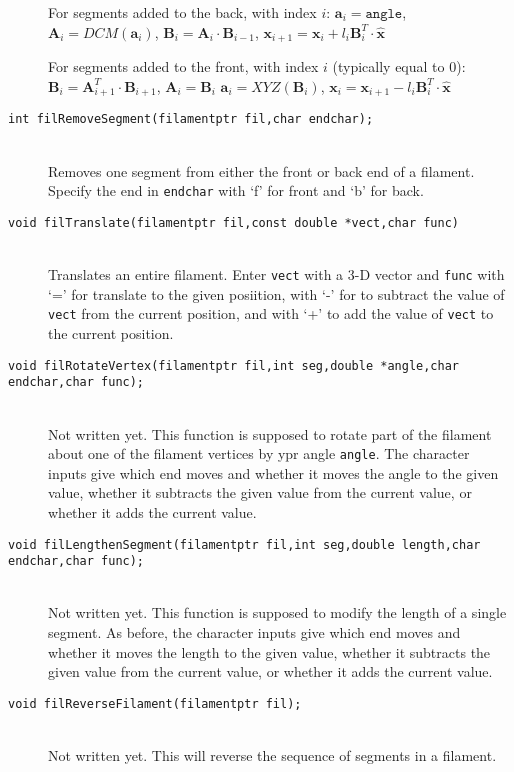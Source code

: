 \documentclass {book}
\begin{document}
\begin{description}
For segments added to the back, with index $i$:
$\mathbf{a}_i = \texttt{angle}$,
$\mathbf{A}_i = DCM(\mathbf{a}_i)$,
$\mathbf{B}_i = \mathbf{A}_i \cdot \mathbf{B}_{i-1}$,
$\mathbf{x}_{i+1} = \mathbf{x}_i + l_i \mathbf{B}^T_i \cdot \mathbf{\hat{x}}$

For segments added to the front, with index $i$ (typically equal to 0):
$\mathbf{B}_i = \mathbf{A}_{i+1}^T \cdot \mathbf{B}_{i+1}$,
$\mathbf{A}_i = \mathbf{B}_i$
$\mathbf{a}_i = XYZ(\mathbf{B}_i)$,
$\mathbf{x}_i = \mathbf{x}_{i+1} - l_i \mathbf{B}^T_i \cdot \mathbf{\hat{x}}$

\item[\texttt{int filRemoveSegment(filamentptr fil,char endchar);}]
\hfill \\
Removes one segment from either the front or back end of a filament.  Specify the end in \texttt{endchar} with `f' for front and `b' for back.

\item[\texttt{void filTranslate(filamentptr fil,const double *vect,char func)}]
\hfill \\
Translates an entire filament.  Enter \texttt{vect} with a 3-D vector and \texttt{func} with `=' for translate to the given posiition, with `-' for to subtract the value of \texttt{vect} from the current position, and with `+' to add the value of \texttt{vect} to the current position.

\item[\texttt{void filRotateVertex(filamentptr fil,int seg,double *angle,char endchar,char func);}]
\hfill \\
Not written yet.  This function is supposed to rotate part of the filament about one of the filament vertices by ypr angle \texttt{angle}.  The character inputs give which end moves and whether it moves the angle to the given value, whether it subtracts the given value from the current value, or whether it adds the current value.

\item[\texttt{void filLengthenSegment(filamentptr fil,int seg,double length,char endchar,char func);}]
\hfill \\
Not written yet.  This function is supposed to modify the length of a single segment.  As before, the character inputs give which end moves and whether it moves the length to the given value, whether it subtracts the given value from the current value, or whether it adds the current value.

\item[\texttt{void filReverseFilament(filamentptr fil);}]
\hfill \\
Not written yet.  This will reverse the sequence of segments in a filament.


\end{description}
\end{document}

